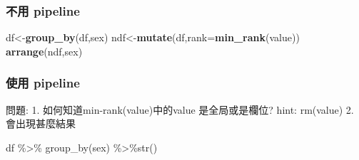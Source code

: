 \documentclass[]{book}
\newenvironment{Shaded}{\begin{snugshade}}{\end{snugshade}}
\newcommand{\KeywordTok}[1]{\textcolor[rgb]{0.13,0.29,0.53}{\textbf{#1}}}
\newcommand{\DataTypeTok}[1]{\textcolor[rgb]{0.13,0.29,0.53}{#1}}
\newcommand{\StringTok}[1]{\textcolor[rgb]{0.31,0.60,0.02}{#1}}
\newcommand{\OperatorTok}[1]{\textcolor[rgb]{0.81,0.36,0.00}{\textbf{#1}}}
\newcommand{\NormalTok}[1]{#1}
\theoremstyle{definition}
\theoremstyle{definition}
\theoremstyle{definition}
\theoremstyle{remark}
\begin{document}
\subsubsection{不用 pipeline}\label{-pipeline}

\begin{Shaded}
\begin{Highlighting}[]
\NormalTok{df<-}\KeywordTok{group_by}\NormalTok{(df,sex)}
\NormalTok{ndf<-}\KeywordTok{mutate}\NormalTok{(df,}\DataTypeTok{rank=}\KeywordTok{min_rank}\NormalTok{(value))}
\KeywordTok{arrange}\NormalTok{(ndf,sex)}
\end{Highlighting}
\end{Shaded}

\subsubsection{使用 pipeline}\label{-pipeline}

\begin{Shaded}
\end{Shaded}

問題: 1. 如何知道min-rank(value)中的value 是全局或是欄位? hint:
rm(value) 2. 會出現甚麼結果

df \%\textgreater{}\% group\_by(sex) \%\textgreater{}\%str()

\begin{Shaded}
\end{Shaded}

\begin{Shaded}
\end{Shaded}
\end{document}
